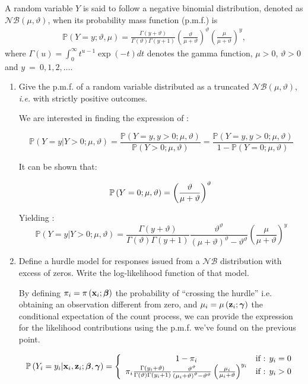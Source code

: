 \documentclass[a4paper,12pt]{article}\usepackage[]{graphicx}\usepackage[]{color}
\def\bx{\mathbf{x}}
\def\bz{\mathbf{z}}
\def\bbeta{\mbox{\boldmath $\beta$}}
\def\bgamma{\mbox{\boldmath $\gamma$}}
\def\op{\left(}
\def\cp{\right)}
\def\ok{\left\{}
\def\Proba{\mathbb{P}}
\begin{document}
A random variable $Y$ is said to follow a negative binomial distribution, denoted as $\mathcal{NB}(\mu,\vartheta)$, when its probability mass function (p.m.f.) is
\begin{eqnarray*}
\Proba(Y = y ; \vartheta, \mu) = \frac {\Gamma(y+\vartheta)}{\Gamma(\vartheta)\Gamma(y+1)}\left(\frac{\vartheta}{\mu+\vartheta}\right)^\vartheta
\left(\frac{\mu}{\mu+\vartheta}\right)^{y},
\end{eqnarray*}
where $\Gamma(u)=\int_0^\infty t^{u-1}\exp(-t)dt$ denotes the gamma function, $\mu>0$, $\vartheta>0$ and $y~=~0,1,2,\ldots$.
\begin{enumerate}[ref=\bf{\alph*)}]
\item Give the p.m.f. of a random variable distributed as a truncated $\mathcal{NB}(\mu,\vartheta)$, \textit{i.e.} with strictly positive outcomes.

\color{blue}
We are interested in finding the expression of :

$$
\Proba \op Y = y  |   Y> 0 ; \mu , \vartheta \cp  
= \frac {\Proba \op Y = y , y > 0 ; \mu , \vartheta \cp}{\Proba\op Y>0 ; \mu, \vartheta\cp}
= \frac {\Proba \op Y = y , y > 0 ; \mu , \vartheta \cp}{1-\Proba\op Y = 0 ; \mu, \vartheta\cp}
$$  	

It can be shown that: 

$$
\Proba\op Y=0 ; \mu, \vartheta\cp = \op \frac{\vartheta }{\mu + \vartheta }\cp^\vartheta \\ 
$$  

Yielding : 
$$
\Proba \op Y = y | Y> 0 ; \mu , \vartheta \cp 
= \frac {\Gamma(y+\vartheta)}{\Gamma(\vartheta)\Gamma(y+1)} 
\frac{\vartheta^\vartheta}{\op\mu+\vartheta\cp^\vartheta - \vartheta^\vartheta}
\op\frac{\mu}{\mu+\vartheta}\cp^{y}
$$ 

\color{black}
\item \label{loglkhd}Define a hurdle model for responses issued from a $\mathcal{NB}$ distribution with excess of zeros. Write the log-likelihood function of that model.
\color{blue} 

By defining $\pi_i = \pi\op \bx_i ; \bbeta\cp$ the probability of ``crossing the hurdle'' i.e. obtaining an observation different from zero, and  $\mu_i = \mu\op \bz_i; \bgamma\cp$ the conditional expectation of the count process, we can provide the expression for the likelihood contributions using the p.m.f. we've found on the previous point. 

$$
\Proba\op Y_i = y_i | \bx_i , \bz_i ; \bbeta, \bgamma \cp 
= 
\ok
\begin{array}{c c}
1- \pi_i  & \textrm{if : } y_i = 0 \\ 
\pi_i
\frac {\Gamma(y_i+\vartheta)}{\Gamma(\vartheta)\Gamma(y_i+1)} 
\frac{\vartheta^\vartheta}{\op\mu_i+\vartheta\cp^\vartheta - \vartheta^\vartheta}
\op\frac{\mu_i}{\mu_i+\vartheta}\cp^{y_i} & \textrm{if : } y_i > 0 
\end{array}
\right.
$$ 


\end{enumerate}
\end{document}
